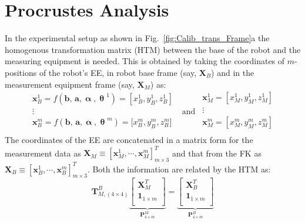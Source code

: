 \section{Procrustes Analysis }
\label{app:Procrustes}
In the experimental setup as shown in Fig.~\ref{fig:Calib_trans_Frame}a the homogenous transformation matrix (HTM) between the base of the robot and the measuring equipment is needed. This is obtained by taking the coordinates of $m$-positions of the robot's EE, in robot base frame (say, $\mathbf{X}_B$) and in the measurement equipment frame (say, $\mathbf{X}_M$) as:
\begin{equation}
 \begin{matrix}
   {\mathbf{x}_{B}^{1}=f(\textbf{b, a}, \boldsymbol{\upalpha, {{\uptheta }}}^{1})=[x_{B}^{1},y_{B}^{1},z_{B}^{1}]}  \nonumber \\ 
   \vdots \\
   {\mathbf{x}_{B}^{m}=f(\textbf{b, a},\boldsymbol{\upalpha ,{{\uptheta }}}^{m})=[x_{B}^{m},y_{B}^{m},z_{B}^{m}}]  \\
\end{matrix} ~~~ \text{and} ~~ \begin{matrix}
   \mathbf{x}_{M}^{1}=[x_{M}^{1},y_{M}^{1},z_{M}^{1}]   \\
   \vdots    \\
   \mathbf{x}_{M}^{m}=[x_{M}^{m},y_{M}^{m},z_{M}^{m}]    \\
\end{matrix} 
\end{equation}
The coordinates of the EE are concatenated in a matrix form for the measurement data as $\mathbf{X}_M \equiv [\mathbf{x}_M^1, \cdots, \mathbf{x}_M^m]_{m \times 3}^T$ and that from the FK as $\mathbf{X}_B \equiv [\mathbf{x}_B^1, \cdots, \mathbf{x}_B^m]_{m \times 3}^T$. Both the information are related by the HTM as:
\begin{equation}
\label{eq:tran_pinv}
\mathbf{T}_{M,(4\times 4)}^{B} \underbrace{{\left[ \begin{matrix}
   \mathbf{X}_{M}^{T}  \\
   {{\mathbf{1}}_{1\times m}}  \\
\end{matrix} \right]}}_{\textbf{P}^M_{4\times m}}=\underbrace{{\left[ \begin{matrix}
   \mathbf{X}_{B}^{T}  \\
   {{\mathbf{1}}_{1\times m}}  \\
\end{matrix} \right]}}_{\textbf{P}^B_{4\times m}}
\end{equation}
